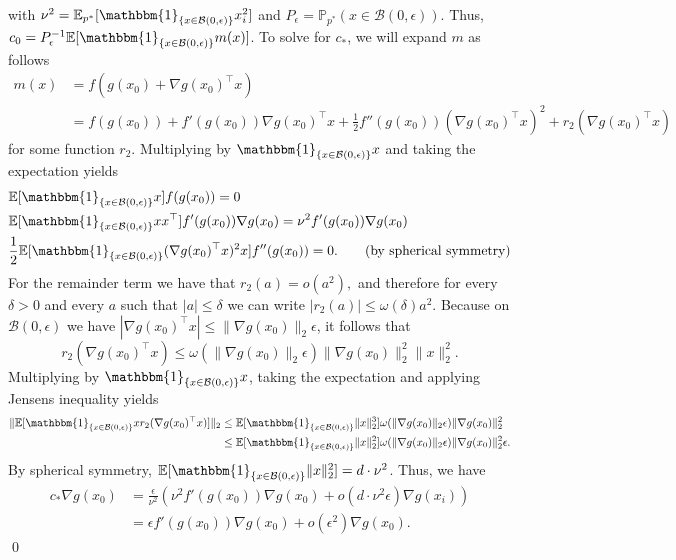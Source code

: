 \documentclass[11pt]{article}
\begin{document}
\begin{appendices}
with $\nu^2 = \mathbb{E}_{p^*}[\mathbbm{1}_{\{x \in \mathcal{B}(0, \epsilon)\}}x_i^2]$ and $P_{\epsilon} = \mathbb{P}_{p^*}(x \in \mathcal{B}(0, \epsilon)).$ Thus, $c_0 = P_\epsilon^{-1} \mathbb{E}[\mathbbm{1}_{\{x \in \mathcal{B}(0, \epsilon)\}}m(x)]$. To solve for $c_*$, we will expand $m$ as follows
\begin{align*}
    m(x) &= f\left(g(x_0) + \nabla g(x_0)^{\top}x\right) \\
    &= f(g(x_0)) + f'(g(x_0))\nabla g(x_0)^{\top}x + \frac{1}{2}f''(g(x_0))(\nabla g(x_0)^{\top}x)^2 + r_2(\nabla g(x_0)^\top x)
\end{align*}
for some function $r_2$. Multiplying by $\mathbbm{1}_{\{x \in \mathcal{B}(0, \epsilon)\}}x$ and taking the expectation yields
\begin{align*}
    &\mathbb{E}[\mathbbm{1}_{\{x \in \mathcal{B}(0, \epsilon)\}}x]f(g(x_0)) = 0 \\
    &\mathbb{E}[\mathbbm{1}_{\{x \in \mathcal{B}(0, \epsilon)\}}xx^{\top}]f'(g(x_0))\nabla g(x_0) = \nu^2f'(g(x_0))\nabla g(x_0) \\
    & \frac{1}{2}\mathbb{E}[\mathbbm{1}_{\{x \in \mathcal{B}(0, \epsilon)\}}(\nabla g(x_0)^{\top}x)^2x]f''(g(x_0)) = 0. \tag{by spherical symmetry}
\end{align*}
For the remainder term we have that $r_2(a) = o(a^2), $ and therefore for every $\delta >0$ and every $a$ such that $|a|\leq \delta$ we can write $|r_2(a)| \le \omega(\delta)a^2$. Because on $\mathcal{B}(0, \epsilon)$ we have $|\nabla g(x_0)^\top x| \leq \|\nabla g(x_0)\|_2\epsilon$, it follows that 
\[r_2(\nabla g(x_0)^\top x) \leq \omega(\|\nabla g(x_0)\|_2\epsilon)\|\nabla g(x_0)\|_2^2\|x\|_2^2.\]
Multiplying by $\mathbbm{1}_{\{x \in \mathcal{B}(0, \epsilon)\}}x$, taking the expectation and applying Jensens inequality yields
\begin{align*}
    \|\mathbb{E}[\mathbbm{1}_{\{x \in \mathcal{B}(0, \epsilon)\}}x r_2(\nabla g(x_0)^\top x)]\|_2 &\leq \mathbb{E}[\mathbbm{1}_{\{x \in \mathcal{B}(0, \epsilon)\}}\|x\|_2^3]\omega(\|\nabla g(x_0)\|_2 \epsilon)\|\nabla g(x_0)\|_2^2  \\
    &\leq \mathbb{E}[\mathbbm{1}_{\{x \in \mathcal{B}(0, \epsilon)\}}\|x\|_2^2]\omega(\|\nabla g(x_0)\|_2 \epsilon)\|\nabla g(x_0)\|_2^2\epsilon.
\end{align*}
By spherical symmetry, $\mathbb{E}[\mathbbm{1}_{\{x \in \mathcal{B}(0, \epsilon)\}}\|x\|_2^2] = d\cdot \nu^2$. Thus, we have
\begin{align*}
    c_* \nabla g(x_0) &= \frac{\epsilon}{\nu^2}\left(\nu^2f'( g(x_0))\nabla g(x_0) + o(d\cdot\nu^2\epsilon)\nabla g(x_i)\right) \\
    &= \epsilon f'( g(x_0))\nabla g(x_0)+ o(\epsilon^2)\nabla g(x_0).
\end{align*}
\qed{}


\end{appendices}
\end{document}

